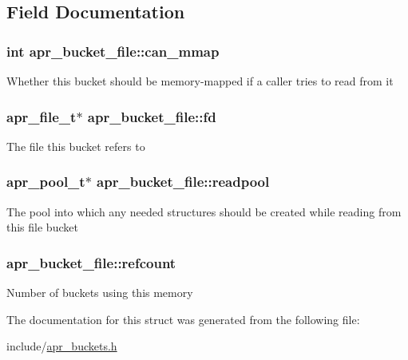 \subsection{Field Documentation}
\hypertarget{structapr__bucket__file_a7812a8d6e6f10d0095569f04d3423e83}{
\subsubsection[{can\-\_\-mmap}]{\setlength{\rightskip}{0pt plus 5cm}int apr\-\_\-bucket\-\_\-file\-::can\-\_\-mmap}}\label{structapr__bucket__file_a7812a8d6e6f10d0095569f04d3423e83}
Whether this bucket should be memory-\/mapped if a caller tries to read from it \hypertarget{structapr__bucket__file_aa43154c0bc9d41ba4b0762c906de432f}{
\subsubsection[{fd}]{\setlength{\rightskip}{0pt plus 5cm}apr\-\_\-file\-\_\-t$\ast$ apr\-\_\-bucket\-\_\-file\-::fd}}\label{structapr__bucket__file_aa43154c0bc9d41ba4b0762c906de432f}
The file this bucket refers to \hypertarget{structapr__bucket__file_a61b5603482215f6c9ace7b26fa12b884}{
\subsubsection[{readpool}]{\setlength{\rightskip}{0pt plus 5cm}apr\-\_\-pool\-\_\-t$\ast$ apr\-\_\-bucket\-\_\-file\-::readpool}}\label{structapr__bucket__file_a61b5603482215f6c9ace7b26fa12b884}
The pool into which any needed structures should be created while reading from this file bucket \hypertarget{structapr__bucket__file_ab0c123f34b85a07b601dc9794f8eed09}{
\subsubsection[{refcount}]{ apr\-\_\-bucket\-\_\-file\-::refcount}}\label{structapr__bucket__file_ab0c123f34b85a07b601dc9794f8eed09}
Number of buckets using this memory 

The documentation for this struct was generated from the following file\-:\begin{DoxyCompactItemize}
\item 
include/\hyperlink{apr__buckets_8h}{apr\-\_\-buckets.\-h}\end{DoxyCompactItemize}
